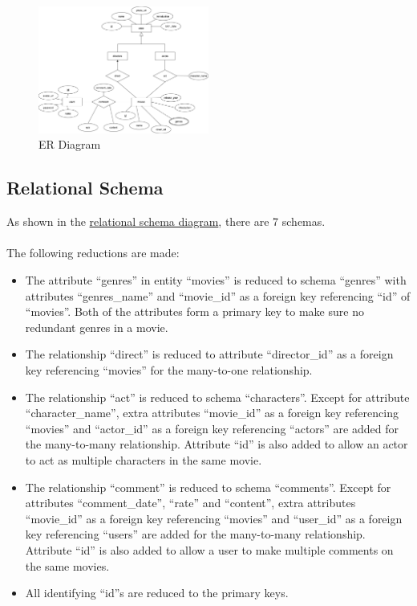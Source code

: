 \begin{CJK*}{UTF8}{gbsn}
\begin{figure}[h]
\centering
\label{ERD}
\includegraphics[width=0.5\textwidth]{er.png}
\caption{ER Diagram}
\end{figure}

\subsection{Relational Schema}
As shown in the \hyperref[RelationalSchema]{relational schema diagram}, there are 7 schemas. \\\\
The following reductions are made:
\begin{itemize}
\item The attribute ``genres'' in entity ``movies'' is reduced to schema ``genres'' with attributes ``genres\_name'' and ``movie\_id'' as a foreign key referencing ``id'' of ``movies''. Both of the attributes form a primary key to make sure no redundant genres in a movie.
\item The relationship ``direct'' is reduced to attribute ``director\_id'' as a foreign key referencing ``movies'' for the many-to-one relationship. 
\item The relationship ``act'' is reduced to schema ``characters''. Except for attribute ``character\_name'', extra attributes ``movie\_id'' as a foreign key referencing ``movies'' and ``actor\_id'' as a foreign key referencing ``actors'' are added for the many-to-many relationship. Attribute ``id'' is also added to allow an actor to act as multiple characters in the same movie. 
\item The relationship ``comment'' is reduced to schema ``comments''. Except for attributes ``comment\_date'', ``rate'' and ``content'', extra attributes ``movie\_id'' as a foreign key referencing ``movies'' and ``user\_id'' as a foreign key referencing ``users'' are added for the many-to-many relationship. Attribute ``id'' is also added to allow a user to make multiple comments on the same movies. 
\item All identifying ``id''s are reduced to the primary keys. 
\end{itemize}


\end{CJK*}
